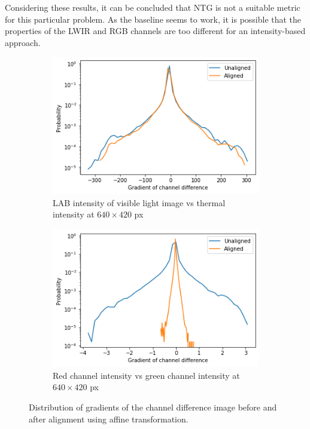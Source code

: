 \documentclass{l4proj}
\begin{document}
Considering these results, it can be concluded that NTG is not a suitable metric for this particular problem. As the baseline seems to work, it is possible that the properties of the LWIR and RGB channels are too different for an intensity-based approach.

\begin{figure}[ht]
  \centering
  \begin{subfigure}[h!]{0.45\textwidth}
    \includegraphics[width=\textwidth]{images/registration/gradient_distribution.png}
    \caption{LAB intensity of visible light image vs thermal intensity at $640 \times 420$ px}
    \label{fig:gradient_distribution}
  \end{subfigure}
  \begin{subfigure}[h!]{0.45\textwidth}
    \includegraphics[width=\textwidth]{images/registration/gradient_distribution_red_green.png}
    \caption{Red channel intensity vs green channel intensity at $640 \times 420$ px}
    \label{fig:gradient_distribution_red_green}
  \end{subfigure}
  \caption{Distribution of gradients of the channel difference image before and after alignment using affine transformation.}
\end{figure}
\end{document}
